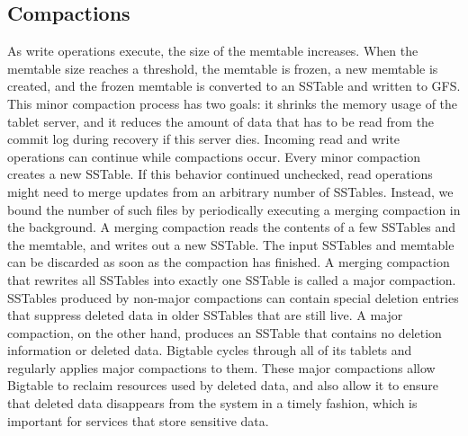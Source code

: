\documentclass[twocolumn]{article}
\begin{document}
\subsection{Compactions}
As write operations execute, the size of the memtable increases. When the memtable size reaches a threshold, the memtable is frozen, a new memtable is created, and the frozen memtable is converted to an SSTable and written to GFS. This minor compaction process has two goals: it shrinks the memory usage of the tablet server, and it reduces the amount of data that has to be read from the commit log during recovery if this server dies. Incoming read and write operations can continue while compactions occur.
Every minor compaction creates a new SSTable. If this behavior continued unchecked, read operations might need to merge updates from an arbitrary number of SSTables. Instead, we bound the number of such files by periodically executing a merging compaction in the background. A merging compaction reads the contents of a few SSTables and the memtable, and writes out a new SSTable. The input SSTables and memtable can be discarded as soon as the compaction has finished.
A merging compaction that rewrites all SSTables into exactly one SSTable is called a major compaction. SSTables produced by non-major compactions can contain special deletion entries that suppress deleted data in older SSTables that are still live. A major compaction, on the other hand, produces an SSTable that contains no deletion information or deleted data. Bigtable cycles through all of its tablets and regularly applies major compactions to them. These major compactions allow Bigtable to reclaim resources used by deleted data, and also allow it to ensure that deleted data disappears from the system in a timely fashion, which is important for services that store sensitive data.
\end{document}
